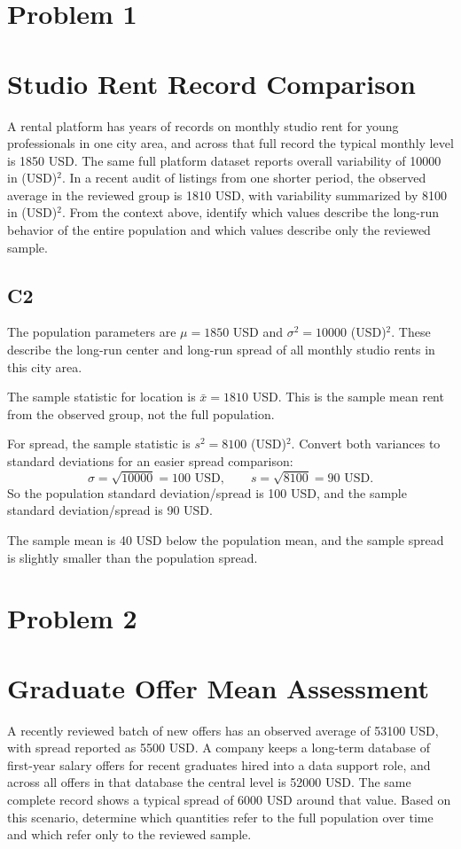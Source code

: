 	\begin{ExamProblems}
		\item
		\section{Problem 1}
		\section{Studio Rent Record Comparison}
		A rental platform has years of records on monthly studio rent for young professionals in one city area, and across that full record the typical monthly level is 1850 USD.
		The same full platform dataset reports overall variability of 10000 in (USD)$^2$.
		In a recent audit of listings from one shorter period, the observed average in the reviewed group is 1810 USD, with variability summarized by 8100 in (USD)$^2$.
		From the context above, identify which values describe the long-run behavior of the entire population and which values describe only the reviewed sample.

\subsection*{C2}
		The population parameters are $\mu = 1850$ USD and $\sigma^2 = 10000$ (USD)$^2$.
		These describe the long-run center and long-run spread of all monthly studio rents in this city area.

		The sample statistic for location is $\bar{x} = 1810$ USD.
		This is the sample mean rent from the observed group, not the full population.

		For spread, the sample statistic is $s^2 = 8100$ (USD)$^2$.
		Convert both variances to standard deviations for an easier spread comparison:
		\[
		\sigma = \sqrt{10000} = 100 \text{ USD},
		\qquad
		s = \sqrt{8100} = 90 \text{ USD}.
		\]
		So the population standard deviation/spread is 100 USD, and the sample standard deviation/spread is 90 USD.

		The sample mean is 40 USD below the population mean, and the sample spread is slightly smaller than the population spread.

		\newpage
		\item
		\section{Problem 2}
		\section{Graduate Offer Mean Assessment}
		A recently reviewed batch of new offers has an observed average of 53100 USD, with spread reported as 5500 USD.
		A company keeps a long-term database of first-year salary offers for recent graduates hired into a data support role, and across all offers in that database the central level is 52000 USD.
		The same complete record shows a typical spread of 6000 USD around that value.
		Based on this scenario, determine which quantities refer to the full population over time and which refer only to the reviewed sample.


\end{ExamProblems}
